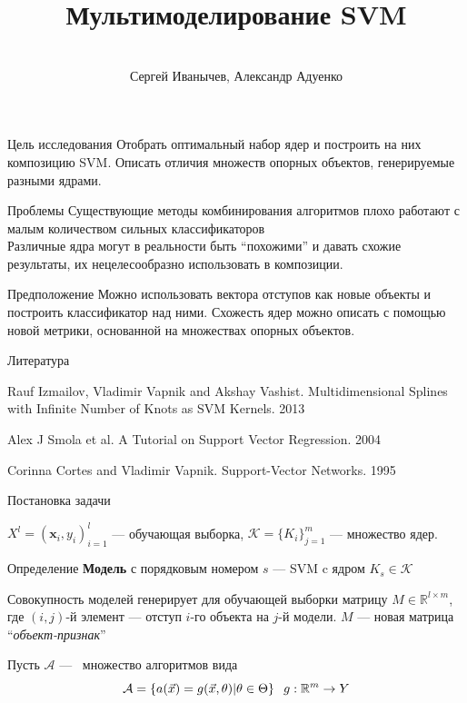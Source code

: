 \documentclass{beamer}
\title[\hbox to 56mm{\hfill\insertframenumber\,/\,\inserttotalframenumber}]
{Мультимоделирование SVM}
\author[С. Иванычев, А. Адуенко]{\large \\Сергей Иванычев, Александр Адуенко}
\institute[МФТИ]{Московский физико-технический институт \\
    Факультет управления и прикладной математики\\
    Кафедра <<Интеллектуальные системы>>
}
\date{\footnotesize{}}
\begin{document}

\begin{frame}
\titlepage
\end{frame}
\begin{frame}{Цель исследования}
Отобрать оптимальный набор ядер и построить на них композицию SVM. Описать
отличия множеств опорных объектов, генерируемые разными ядрами.


     \begin{block}{Проблемы}
        Существующие методы комбинирования алгоритмов плохо работают с малым количеством сильных классификаторов\\
        Различные ядра могут в реальности быть ``похожими'' и давать схожие результаты,
        их нецелесообразно использовать в композиции. 
    \end{block}
    \begin{block}{Предположение}
        Можно использовать вектора отступов как новые объекты и построить классификатор над ними. Схожесть ядер можно описать с помощью новой метрики, основанной на множествах опорных объектов. 
    \end{block}
\end{frame}
\begin{frame}{Литература}
    \begin{enumerate}
        \footnotesize {
        \item
            Rauf Izmailov, Vladimir Vapnik and Akshay Vashist. Multidimensional Splines with Infinite Number of Knots as SVM Kernels. 2013
        \item
            Alex J Smola et al. A Tutorial on Support Vector Regression. 2004
        \item
            Corinna Cortes and Vladimir Vapnik. Support-Vector Networks. 1995
            }
     \end{enumerate}
\end{frame}
\begin{frame}{Постановка задачи}
    
        $X^l = (\mathbf{x}_i, y_i)_{i=1}^l$ --- обучающая выборка, $\mathcal{K} = \{K_i\}_{j=1}^m$ --- множество ядер. 
    \begin{block}{Определение}
        \textbf{Модель} с порядковым номером $s$ --- SVM c ядром $K_s \in \mathcal{K}$
    \end{block}

    Совокупность моделей генерирует для обучающей выборки матрицу $M \in \mathbb{R}^{l \times m}$, где $(i, j)$-й элемент --- отступ $i$-го объекта на $j$-й модели.
    $M$ --- новая матрица ``\emph{объект-признак}''

    Пусть $\mathcal{A}$ ---~ множество алгоритмов вида
$$
    \mathcal{A} = \left\{a(\vec{x}) = g(\vec{x}, \theta)|\theta \in \Theta\right\}\;\; g:\mathbb{R}^m \to Y
$$

\end{frame}
\end{document}
